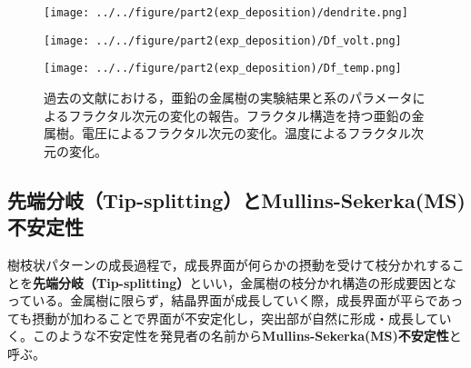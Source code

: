 \documentclass[autodetect-engine,dvi=dvipdfmx,a4paper,ja=standard,oneside,openany,11pt]{bxjsbook}
\begin{document}
\begin{figure}[htbp]
  \begin{minipage}{0.28\textwidth}
    \subcaption{}
    \centering
    \texttt{[image: ../../figure/part2(exp\_deposition)/dendrite.png]}
    \label{fig:el_dep_fractal}
  \end{minipage}
  \begin{minipage}
    {0.35\textwidth}
    \subcaption{}
    \centering
    \texttt{[image: ../../figure/part2(exp\_deposition)/Df\_volt.png]}
    \label{fig:Df_volt}
  \end{minipage}
  \begin{minipage}
    {0.35\textwidth}
    \subcaption{}
    \centering
    \texttt{[image: ../../figure/part2(exp\_deposition)/Df\_temp.png]}
    \label{fig:Df_temp}
  \end{minipage}
  \caption{過去の文献における，亜鉛の金属樹の実験結果と系のパラメータによるフラクタル次元の変化の報告。フラクタル構造を持つ亜鉛の金属樹\cite{matsushita1984fractal}。電圧によるフラクタル次元の変化\cite{matsushita1984fractal}。温度によるフラクタル次元の変化\cite{suda2003temperature}。}
  \label{fig:fractal_dimension}
\end{figure}

\subsection{先端分岐（Tip-splitting）とMullins-Sekerka(MS)不安定性}
\label{sec:tip_splitting}
樹枝状パターンの成長過程で，成長界面が何らかの摂動を受けて枝分かれすることを\textbf{先端分岐（Tip-splitting）}といい，金属樹の枝分かれ構造の形成要因となっている。金属樹に限らず，結晶界面が成長していく際，成長界面が平らであっても摂動が加わることで界面が不安定化し，突出部が自然に形成・成長していく。このような不安定性を発見者の名前から\textbf{Mullins-Sekerka(MS)不安定性}と呼ぶ。
\end{document}
